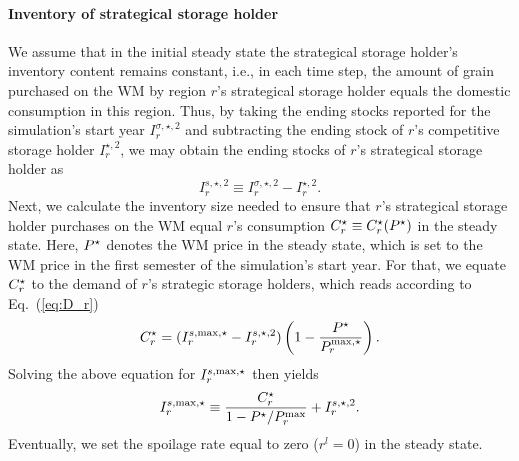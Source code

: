 \paragraph{Inventory of strategical storage holder}
We assume that in the initial steady state the strategical storage holder's inventory content
remains constant, i.e., in each time step, the amount of grain purchased on the WM by region $r$'s
strategical storage holder equals the domestic consumption in this region. Thus, by taking the
ending stocks reported for the simulation's start year $I_r^{\sigma,\star,2}$ and subtracting the
ending stock of $r$'s competitive storage holder $I_r^{\star,2}$, we may obtain the ending stocks of
$r$'s strategical storage holder as
\begin{equation}
  \label{eq:ES_strat}
 I^{s,\star,2}_r\equiv I_r^{\sigma,\star,2} - I_r^{\star,2}.
\end{equation}
Next, we calculate the inventory size needed to ensure that $r$'s strategical storage holder
purchases on the WM equal $r$'s consumption $C^{\star}_r\equiv C^{\star}_r(P^{\star})$ in the steady
state. Here, $P^{\star}$ denotes the WM price in the steady state, which is set to the WM price in the
first semester of the simulation's start year. For that, we equate $C^{\star}_r$ to the demand of $r$'s
strategic storage holders, which reads according to Eq.~(\ref{eq:D_r})
\begin{equation}
  \label{eq:starCr}
  C^{\star}_r = (I^{s,\operatorname{max},\star}_r - I_r^{s,\star,2}) \left(1-\frac{P^{\star}}{P^{\operatorname{max},\star}_r} \right).
\end{equation}
Solving the above equation for $I^{s,\operatorname{max},\star}_r$ then yields
\begin{equation}
  \label{eq:IrmaxIni}
  I^{s,\operatorname{max},\star}_r \equiv \frac{C^{\star}_r}{1 - P^{\star}/P^{\operatorname{max}}_r}  + I_r^{s,\star,2}.
\end{equation}
Eventually, we set the spoilage rate equal to zero ($r^l=0$) in the steady state.

